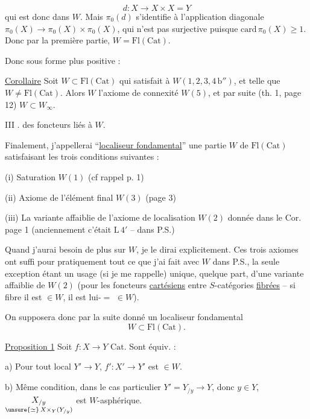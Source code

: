 
\[d:X\longrightarrow X\times X=Y\] qui est donc dans $W$.  Mais  $\pi_0(d)$ s'identifie à l'application diagonale  $\pi_0(X)\longrightarrow\pi_0(X)\times\pi_0(X)$, qui n'est pas surjective puisque $\mathrm{card}\,\pi_0(X)\geq1$. Donc par la première partie, $W=\mathrm{Fl}(\mathrm{Cat})$.

Donc sous forme plus positive :

\uline{Corollaire} Soit $W\subset\mathrm{Fl}(\mathrm{Cat})$ qui satisfait à $W(1,2,3,4\,\mathrm b'')$, et telle que $W\ne\mathrm{Fl}(\mathrm{Cat})$. Alors $W$  l'axiome de connexité $W(5)$, et par suite (th. 1, page 12) $W\subset W_\infty$.

III .  des foncteurs liés à $W$.

Finalement, j'appellerai ``\uline{localiseur fondamental}'' une partie $W$ de $\mathrm{Fl}(\mathrm{Cat})$ satisfaisant les trois conditions suivantes :

(i) Saturation $W(1)$ (cf rappel p. 1)

(ii) Axiome de l'élément final $W(3)$ (page 3)

(iii) La variante affaiblie  de  l'axiome de localisation $W(2)$ donnée dans le Cor. page 1 (anciennement c'était $\mathrm L\,4'$ -- dans P.S.)

Quand j'aurai besoin de plus sur $W$, je le dirai explicitement. Ces trois axiomes ont suffi pour  pratiquement tout ce que j'ai fait avec $W$ dans P.S., la seule exception étant un usage (si je me rappelle) unique, quelque part, d'une variante affaiblie de $W(2)$ (pour les foncteurs \uline{cartésiens} entre $S$-catégories \uline{fibrées} -- si    fibre il est $\in W$, il est lui-$=$ $\in W$).

On supposera donc par la suite donné un localiseur fondamental  \[W\subset\mathrm{Fl}(\mathrm{Cat}).\]

\uline{Proposition 1} Soit $f:X\longrightarrow Y$   $\mathrm{Cat}$. Sont équiv. :

a) Pour tout  local $Y'\longrightarrow Y$, $f':X'\longrightarrow Y'$ est $\in W$.

b) Même condition, dans le cas particulier $Y'=Y_{/y}\longrightarrow Y$, donc \deleted{$\unsure{\forall}$} $y\in Y$, $\underset{\unsure{\simeq}\,X\times_Y(Y_{/y})}{X_{/y}}$ est $W$-asphérique.

